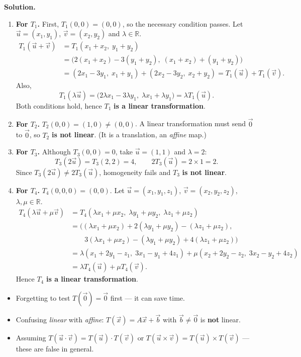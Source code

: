 \documentclass[11pt]{article}
\begin{document}
\begin{exoresolu}
\textbf{Solution.}
\begin{enumerate}
\item \textbf{For $T_1$.} First, $T_1(0,0)=(0,0)$, so the necessary condition passes. Let $\vec{u}=(x_1,y_1)$, $\vec{v}=(x_2,y_2)$ and $\lambda\in\mathbb{R}$.
\begin{align*}
T_1(\vec{u}+\vec{v})&=T_1(x_1+x_2,\;y_1+y_2)\\
&=\bigl(2(x_1+x_2)-3(y_1+y_2),\;(x_1+x_2)+(y_1+y_2)\bigr)\\
&=(2x_1-3y_1,\;x_1+y_1)+(2x_2-3y_2,\;x_2+y_2)=T_1(\vec{u})+T_1(\vec{v}).
\end{align*}
Also,
\[
T_1(\lambda\vec{u})=\bigl(2\lambda x_1-3\lambda y_1,\;\lambda x_1+\lambda y_1\bigr)=\lambda T_1(\vec{u}).
\]
Both conditions hold, hence $T_1$ \textbf{is a linear transformation}.

\item \textbf{For $T_2$.} $T_2(0,0)=(1,0)\neq(0,0)$. A linear transformation must send $\vec{0}$ to $\vec{0}$, so $T_2$ \textbf{is not linear}. (It is a translation, an \emph{affine} map.)

\item \textbf{For $T_3$.} Although $T_3(0,0)=0$, take $\vec{u}=(1,1)$ and $\lambda=2$:
\[
T_3(2\vec{u})=T_3(2,2)=4,\qquad 2T_3(\vec{u})=2\times 1=2.
\]
Since $T_3(2\vec{u})\neq 2T_3(\vec{u})$, homogeneity fails and $T_3$ \textbf{is not linear}.

\item \textbf{For $T_4$.} $T_4(0,0,0)=(0,0)$. Let $\vec{u}=(x_1,y_1,z_1)$, $\vec{v}=(x_2,y_2,z_2)$, $\lambda,\mu\in\mathbb{R}$.
\begin{align*}
T_4(\lambda\vec{u}+\mu\vec{v})&=T_4(\lambda x_1+\mu x_2,\;\lambda y_1+\mu y_2,\;\lambda z_1+\mu z_2)\\
&=\bigl((\lambda x_1+\mu x_2)+2(\lambda y_1+\mu y_2)-(\lambda z_1+\mu z_2),\\
&\qquad 3(\lambda x_1+\mu x_2)-(\lambda y_1+\mu y_2)+4(\lambda z_1+\mu z_2)\bigr)\\
&=\lambda(x_1+2y_1-z_1,\;3x_1-y_1+4z_1)+\mu(x_2+2y_2-z_2,\;3x_2-y_2+4z_2)\\
&=\lambda T_4(\vec{u})+\mu T_4(\vec{v}).
\end{align*}
Hence $T_4$ \textbf{is a linear transformation}.
\end{enumerate}
\end{exoresolu}

\begin{attention}
\begin{itemize}
\item Forgetting to test $T(\vec{0})=\vec{0}$ first — it can save time.
\item Confusing \emph{linear} with \emph{affine}: $T(\vec{x})=A\vec{x}+\vec{b}$ with $\vec{b}\neq\vec{0}$ is \textbf{not} linear.
\item Assuming $T(\vec{u}\cdot\vec{v})=T(\vec{u})\cdot T(\vec{v})$ or $T(\vec{u}\times\vec{v})=T(\vec{u})\times T(\vec{v})$ — these are false in general.
\end{itemize}
\end{attention}
\end{document}
